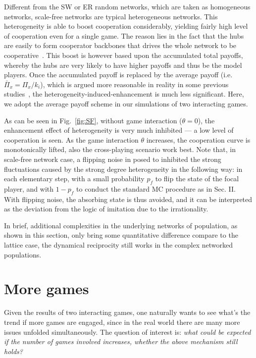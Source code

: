 \documentclass[showpacs,superscriptaddress,reprint,nofootinbib,amsmath,amssymb,aps,pre]{revtex4-1}
\begin{document}
Different from the SW or ER random networks, which are taken as homogeneous networks, scale-free networks are typical heterogeneous networks. This heterogeneity is able to boost cooperation considerably, yielding fairly high level of cooperation even for a single game. The reason lies in the fact that the hubs are easily to form cooperator backbones that drives the whole network to be cooperative~\cite{Santos2005Scale-Free}. This boost is however based upon the accumulated total payoffs, whereby the hubs are very likely to have higher payoffs and thus be the model players. Once the accumulated payoff is replaced by the average payoff (i.e. $\bar{\Pi}_x=\Pi_x/k_i$), which is argued more reasonable in reality in some previous studies~\cite{Wu2007Evolutionary,Szolnoki2008Towards,Liang2021Social}, the heterogeneity-induced-enhancement is much less significant. Here, we adopt the average payoff scheme in our simulations of two interacting games.

As can be seen in Fig.~\ref{fig:SF}, without game interaction ($\theta=0$), the enhancement effect of heterogeneity is very much inhibited --- a low level of cooperation is seen. As the game interaction $\theta$ increases, the cooperation curve is monotonically lifted, also the cross-playing scenario work best. Note that, in scale-free network case, a flipping noise in posed to inhibited the strong fluctuations caused by the strong degree heterogeneity in the following way: in each elementary step, with a small probability $p_f$ to flip the state of the focal player, and with $1-p_f$ to conduct the standard MC procedure as in Sec. II. With flipping noise, the absorbing state is thus avoided, and it can be interpreted as the deviation from the logic of imitation due to the irrationality.

In brief, additional complexities in the underlying networks of population, as shown in this section, only bring some quantitative difference compare to the lattice case, the dynamical reciprocity still works in the complex networked populations. 

\section{More games}\label{sec:more}
Given the results of two interacting games, one naturally wants to see what's the trend if more games are engaged, since in the real world there are many more issues unfolded simultaneously. The question of interest is: \emph{what could be expected if the number of games involved increases, whether the above mechanism still holds?} 
\end{document}
